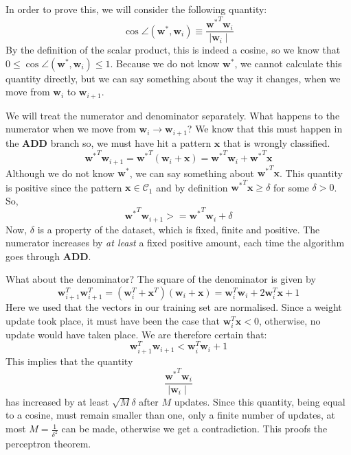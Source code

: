 In order to prove this, we will consider the following quantity:
$$
\cos \angle(\boldsymbol{w}^*, \boldsymbol{w}_i) \equiv \frac{ {\boldsymbol{w}^*}^T  \boldsymbol{w}_i}{\mid \boldsymbol{w}_i \mid}
$$
By the definition of the scalar product, this is indeed a cosine, so we know that $0 \le \cos \angle(\boldsymbol{w}^*, \boldsymbol{w}_i) \le 1$. Because we do not
know $\boldsymbol{w}^*$, we cannot calculate this quantity directly, but we can say something about the way it changes, when we move from $\boldsymbol{w}_i$
to $\boldsymbol{w}_{i+1}$.

We will treat the numerator and denominator separately.
What happens to the numerator when we move from $\boldsymbol{w}_{i} \rightarrow \boldsymbol{w}_{i+1}$? We know that this must happen in the {\bf ADD} branch so, we must
have hit a pattern $\boldsymbol{x}$ that is wrongly classified.
$$
{\boldsymbol{w}^*}^T \boldsymbol{w}_{i+1} = {\boldsymbol{w}^*}^T (\boldsymbol{w}_i + \boldsymbol{x})  = {\boldsymbol{w}^*}^T \boldsymbol{w}_i + {\boldsymbol{w}^*}^T \boldsymbol{x}
$$
Although we do not know $\boldsymbol{w}^*$, we can say something about ${\boldsymbol{w}^*}^T \boldsymbol{x}$. This quantity is positive since the pattern
$\boldsymbol{x} \in \mathcal{C}_1$ and by definition ${\boldsymbol{w}^*}^T \boldsymbol{x} \ge \delta$ for some $\delta > 0$.
So,
$$
{\boldsymbol{w}^*}^T \boldsymbol{w}_{i+1} >= {\boldsymbol{w}^*}^T \boldsymbol{w}_i + \delta
$$
Now, $\delta$ is a property of the dataset, which is fixed, finite and positive. The numerator increases by \emph{at least} a fixed positive amount, each time the algorithm
goes through {\bf ADD}.

What about the denominator? The square of the denominator is given by
$$
\boldsymbol{w}^T_{i+1} \boldsymbol{w}^T_{i+1} = (\boldsymbol{w}_i^T + \boldsymbol{x}^T)(\boldsymbol{w}_i + \boldsymbol{x}) = \boldsymbol{w}^T_{i}\boldsymbol{w}_i +2 \boldsymbol{w}^T_i \boldsymbol{x} + 1  
$$
Here we used that the vectors in our training set are normalised. Since a weight update took place, it must have been the case that $\boldsymbol{w}^T_i \boldsymbol{x} <0$,
otherwise, no update would have taken place. We are therefore certain that:
$$
\boldsymbol{w}^T_{i+1} \boldsymbol{w}_{i+1} <  \boldsymbol{w}^T_{i}\boldsymbol{w}_i  + 1  
$$
This implies that the quantity
$$
\frac{ {\boldsymbol{w}^*}^T  \boldsymbol{w}_i}{\mid \boldsymbol{w}_i \mid}
$$
has increased by at least $\sqrt{M}\delta$ after $M$ updates. Since this quantity, being equal to a cosine,
must remain smaller than one, only a finite number of updates, at most $M =\frac{1}{\delta^2}$ can be made, otherwise we get a contradiction. This proofs the perceptron theorem.


